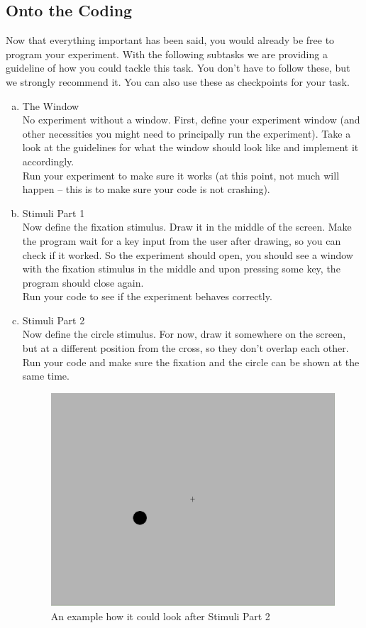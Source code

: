\subsection{Onto the Coding}
\noindent Now that everything important has been said, you would already be free to
program your experiment. With the following subtasks we are providing a
guideline of how you could tackle this task. You don't have to follow these,
but we strongly recommend it. You can also use these as checkpoints for your task.

\begin{enumerate}[a)]
\item The Window\\
No experiment without a window.
First, define your experiment window (and other necessities you might need to
principally run the experiment). Take a look at the guidelines for what the window
should look like and implement it accordingly.\\
Run your experiment to make sure it works (at this point, not much will happen --
this is to make sure your code is not crashing).

\item Stimuli Part 1\\
Now define the fixation stimulus. Draw it in the middle of the screen.
Make the program wait for a key input from the user after drawing, so you can
check if it worked. So the experiment should open, you should see a window with
the fixation stimulus in the middle and upon pressing some key, the program
should close again.\\
Run your code to see if the experiment behaves correctly.

\item Stimuli Part 2\\
Now define the circle stimulus. For now, draw it somewhere on the screen, but
at a different position from the cross, so they don't overlap each other.
Run your code and make sure the fixation and the circle can be shown at the 
same time.

\begin{figure}[h!]
	\centering
	\includegraphics[width=.6\textwidth]{screen1}
	\caption{An example how it could look after Stimuli Part 2}
\end{figure}


\end{enumerate}
